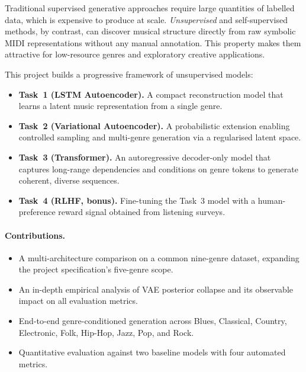 \documentclass[letterpaper]{article}
\begin{document}
Traditional supervised generative approaches require large quantities of
labelled data, which is expensive to produce at scale.  \emph{Unsupervised}
and self-supervised methods, by contrast, can discover musical structure
directly from raw symbolic MIDI representations without any manual annotation.
This property makes them attractive for low-resource genres and exploratory
creative applications.

This project builds a progressive framework of unsupervised models:

\begin{itemize}
  \item \textbf{Task~1 (LSTM Autoencoder).}  A compact reconstruction model
        that learns a latent music representation from a single genre.
  \item \textbf{Task~2 (Variational Autoencoder).}  A probabilistic extension
        enabling controlled sampling and multi-genre generation via a
        regularised latent space.
  \item \textbf{Task~3 (Transformer).}  An autoregressive decoder-only
        model that captures long-range dependencies and conditions on genre
        tokens to generate coherent, diverse sequences.
  \item \textbf{Task~4 (RLHF, bonus).}  Fine-tuning the Task~3 model with
        a human-preference reward signal obtained from listening surveys.
\end{itemize}

\paragraph{Contributions.}
\begin{itemize}
  \item A multi-architecture comparison on a common nine-genre dataset,
        expanding the project specification's five-genre scope.
  \item An in-depth empirical analysis of VAE posterior collapse and its
        observable impact on all evaluation metrics.
  \item End-to-end genre-conditioned generation across Blues, Classical,
        Country, Electronic, Folk, Hip-Hop, Jazz, Pop, and Rock.
  \item Quantitative evaluation against two baseline models with four
        automated metrics.
\end{itemize}

\end{document}
